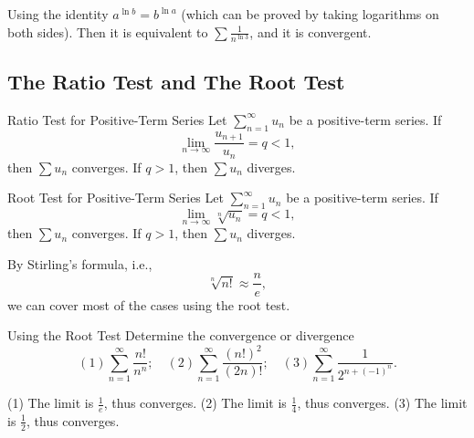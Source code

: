 \begin{solution}
  Using the identity $a^{\ln b} = b^{\ln a}$ (which can be proved by taking
  logarithms on both sides).
  Then it is equivalent to $\sum \frac{1}{n^{\ln 3}}$, and it is convergent.
\end{solution}

\subsection{The Ratio Test and The Root Test}

\begin{theorem}{Ratio Test for Positive-Term Series}{}
  Let $\sum\limits_{n = 1}^{\infty}u_n$ be a positive-term series.
  If
  \begin{equation}
    \lim \limits _{n \rightarrow \infty} \frac{u_{n+1}}{u_n} = q < 1,
  \end{equation}
  then $\sum u_n$ converges. If $q > 1$, then $\sum u_n$ diverges.
\end{theorem}

\begin{theorem}{Root Test for Positive-Term Series}{}
  Let $\sum\limits_{n = 1}^{\infty}u_n$ be a positive-term series.
  If
  \begin{equation}
    \lim \limits _{n \rightarrow \infty} \sqrt[n]{u_n} = q < 1,
  \end{equation}
  then $\sum u_n$ converges. If $q > 1$, then $\sum u_n$ diverges.
\end{theorem}

\begin{note}
  By Stirling's formula, i.e.,
  \begin{equation}
    \sqrt[n]{n!} \approx \frac{n}{e},
  \end{equation}
  we can cover most of the cases using the root test.
\end{note}

\begin{example}{Using the Root Test}{}
  Determine the convergence or divergence
  \begin{equation}
    (1) \sum\limits_{n = 1}^{\infty} \frac{n!}{n^n}; \quad
    (2) \sum\limits_{n = 1}^{\infty} \frac{(n!)^2}{(2n)!}; \quad
    (3) \sum\limits_{n = 1}^{\infty} \frac{1}{2^{n + (-1)^n}}.
  \end{equation}
\end{example}

\begin{solution}
  (1) The limit is $\frac{1}{e}$, thus converges.
  (2) The limit is $\frac{1}{4}$, thus converges.
  (3) The limit is $\frac{1}{2}$, thus converges.
\end{solution}

